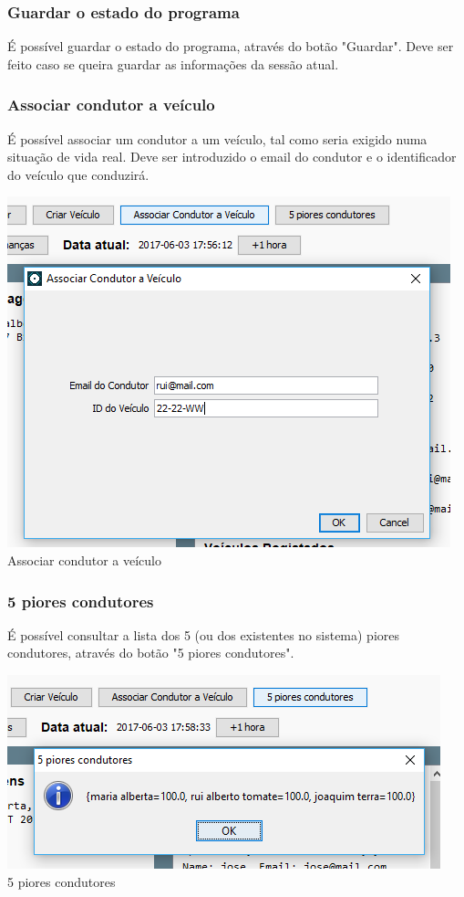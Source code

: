 \documentclass[a4paper]{article}
\begin{document}
\subsubsection{Guardar o estado do programa}
É possível guardar o estado do programa, através do botão "Guardar". Deve ser feito caso se queira guardar as informações da sessão atual.
\subsubsection{Associar condutor a veículo}
É possível associar um condutor a um veículo, tal como seria exigido numa situação de vida real. Deve ser introduzido o email do condutor e o identificador do veículo que conduzirá.
\begin{center}
  \includegraphics[scale=0.75]{outras_associar}\\
  \caption{Associar condutor a veículo}
  \label{fig:picture}
\end{center}
\subsubsection{5 piores condutores}
É possível consultar a lista dos 5 (ou dos existentes no sistema) piores condutores, através do botão "5 piores condutores".
\begin{center}
  \includegraphics[scale=0.75]{outras_5piores}\\
  \caption{5 piores condutores}
  \label{fig:picture}
\end{center}
\end{document}
